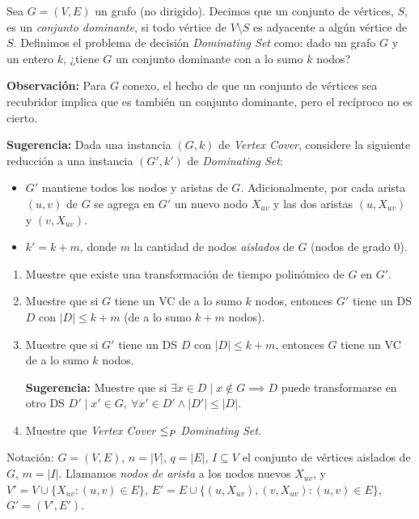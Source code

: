 \begin{enunciado}
Sea $G=(V,E)$ un grafo (no dirigido). Decimos que un conjunto de vértices, $S$, es un \emph{conjunto
dominante}, si todo vértice de $V\setminus S$ es adyacente a algún vértice de $S$. Definimos el problema de
decisión \emph{Dominating Set} como: dado un grafo $G$ y un entero $k$, ¿tiene $G$ un conjunto dominante
con a lo sumo $k$ nodos?

\textbf{Observación:} Para $G$ conexo, el hecho de que un conjunto de vértices sea recubridor implica que
es también un conjunto dominante, pero el recíproco no es cierto.

\textbf{Sugerencia:} Dada una instancia $(G,k)$ de \emph{Vertex Cover}, considere la siguiente reducción a
una instancia $(G',k')$ de \emph{Dominating Set}:
\begin{itemize}
  \item $G'$ mantiene todos los nodos y aristas de $G$. Adicionalmente, por cada arista $(u,v)$ de $G$ se
  agrega en $G'$ un nuevo nodo $X_{uv}$ y las dos aristas $(u,X_{uv})$ y $(v,X_{uv})$.
  \item $k'=k+m$, donde $m$ la cantidad de nodos \emph{aislados} de $G$ (nodos de grado 0).
\end{itemize}
\begin{enumerate}[label=(\alph*)]
  \item Muestre que existe una transformación de tiempo polinómico de $G$ en $G'$.
  \item Muestre que si $G$ tiene un VC de a lo sumo $k$ nodos, entonces $G'$ tiene un DS $D$ con
  $|D|\le k+m$ (de a lo sumo $k+m$ nodos).
  \item Muestre que si $G'$ tiene un DS $D$ con $|D|\le k+m$, entonces $G$ tiene un VC de a lo sumo $k$ nodos.

  \textbf{Sugerencia:} Muestre que si $\exists x\in D \mid x\notin G \implies D$ puede transformarse en otro
  DS $D' \mid x'\in G,\ \forall x'\in D' \wedge |D'|\le|D|$.
  \item Muestre que \emph{Vertex Cover} $\le_P$ \emph{Dominating Set}.
\end{enumerate}
\end{enunciado}


Notación: $G=(V,E)$, $n=|V|$, $q=|E|$, $I\subseteq V$ el conjunto de vértices aislados de $G$, $m=|I|$.
Llamamos \emph{nodos de arista} a los nodos nuevos $X_{uv}$, y $V'=V\cup\{X_{uv}:(u,v)\in E\}$,
$E'=E\cup\{(u,X_{uv}),(v,X_{uv}) : (u,v)\in E\}$, $G'=(V',E')$.

